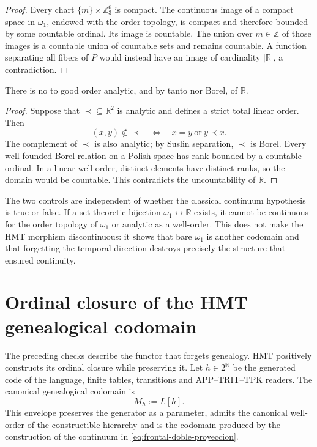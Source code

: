 \begin{proof}
Every chart \(\{m\}\times\mathbb Z_3^6\) is compact. The continuous image of
a compact space in \(\omega_1\), endowed with the order topology, is compact and
therefore bounded by some countable ordinal. Its image is countable.
The union over \(m\in\mathbb Z\) of those images is a countable union of
countable sets and remains countable. A function separating all
fibers of \(P\) would instead have an image of cardinality
\(|\mathbb R|\), a contradiction.
\end{proof}

\begin{theorem}
\label{p12-83-c19-s1:hmtch:thm-no-go-analitico}
There is no to good order analytic, and by tanto nor Borel, of
\(\mathbb R\).
\end{theorem}

\begin{proof}
Suppose that \(\prec\subseteq\mathbb R^2\) is analytic and defines a strict
total linear order. Then
\[
 (x,y)\notin\prec
 \quad\Longleftrightarrow\quad
 x=y\ \text{or}\ y\prec x.
\]
The complement of \(\prec\) is also analytic; by Suslin separation, \(\prec\) is Borel. Every well-founded Borel relation on a Polish space has rank bounded by a countable ordinal. In a linear well-order, distinct elements have distinct ranks, so the domain would be countable. This contradicts the uncountability of \(\mathbb R\).
\end{proof}

The two controls are independent of whether the classical continuum hypothesis is
true or false. If a set-theoretic bijection
\(\omega_1\leftrightarrow\mathbb R\) exists, it cannot be continuous for the
order topology of \(\omega_1\) or analytic as a well-order. This does not make
the HMT morphism discontinuous: it shows that bare \(\omega_1\) is another
codomain and that forgetting the temporal direction destroys precisely the
structure that ensured continuity.

\section{Ordinal closure of the HMT genealogical codomain}

The preceding checks describe the functor that forgets genealogy. HMT
positively constructs its ordinal closure while preserving it. Let
\(h\in2^{\mathbb N}\) be the generated code of the language, finite tables,
transitions and APP--TRIT--TPK readers. The canonical genealogical
codomain is
\[
 M_h:=L[h].
\]
This envelope preserves the generator as a parameter, admits the canonical
well-order of the constructible hierarchy and is the codomain produced by the
construction of the continuum in \eqref{eq:frontal-doble-proyeccion}.

